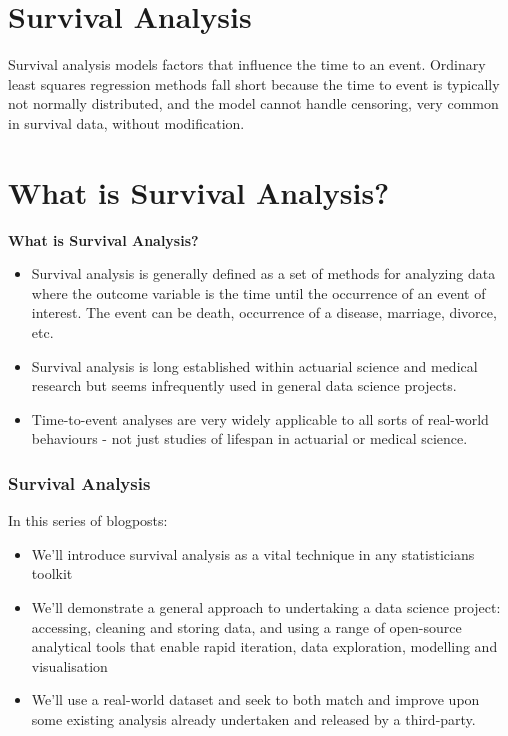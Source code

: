 \documentclass[]{beamer}
\title{}
\author{}
\begin{document}
\section*{Survival Analysis}
	
\begin{frame}	

Survival analysis models factors that influence the time to an event. Ordinary least squares regression methods fall short because the time to event is typically not normally distributed, and the model cannot handle censoring, very common in survival data, without modification. 

\end{frame}
	
	\section{What is Survival Analysis?}
	\begin{frame}
		
		\noindent \textbf{What is Survival Analysis?}
		
		\begin{itemize}
			\item Survival analysis is generally defined as a set of methods for analyzing data where the outcome variable is the time until the occurrence of an event of interest. The event can be death, occurrence of a disease, marriage, divorce, etc.
			
			\item	Survival analysis is long established within actuarial science and medical research but seems infrequently used in general data science projects. 
			\item Time-to-event analyses are very widely applicable to all sorts of real-world behaviours - not just studies of lifespan in actuarial or medical science.
		\end{itemize}
		
		
	\end{frame}
	\begin{frame}
		\frametitle{Survival Analysis}
		In this series of blogposts:	
		\begin{itemize}
			\item We'll introduce survival analysis as a vital technique in any statisticians toolkit
			
			\item We'll demonstrate a general approach to undertaking a data science project: accessing, cleaning and storing data, and using a range of open-source analytical tools that enable rapid iteration, data exploration, modelling and visualisation
			
			\item We'll use a real-world dataset and seek to both match and improve upon some existing analysis already undertaken and released by a third-party.
		\end{itemize}	
		
	\end{frame}
\end{document}
